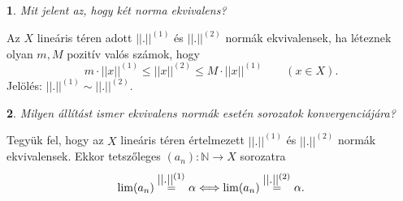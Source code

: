 \documentclass[a4paper]{article}
\def\N{\mathbb{N}}
\theoremstyle{qstyle}
\newtheorem{question}{}{}
\begin{document}
	
	\begin{question}
		Mit jelent az, hogy két norma ekvivalens?
	\end{question}
	Az $X$ lineáris téren adott $||.||^{(1)}$ és $||.||^{(2)}$ normák ekvivalensek, ha léteznek olyan $m,M$ pozitív valós számok, hogy
	$$m\cdot ||x||^{(1)}\le ||x||^{(2)}\le M\cdot ||x||^{(1)}\quad\quad (x\in X)\text{.}$$
	Jelölés: $||.||^{(1)} \sim ||.||^{(2)}$.

	\begin{question}
		Milyen állítást ismer ekvivalens normák esetén sorozatok konvergenciájára?
	\end{question}
	Tegyük fel, hogy az $X$ lineáris téren értelmezett $||.||^{(1)}$ és $||.||^{(2)}$ normák ekvivalensek. Ekkor tetszőleges $(a_n):\N\to X$ sorozatra
	$$\lim(a_n) \overset{\hbox{$||.||^{(1)}$}}{=} \alpha \Longleftrightarrow \lim(a_n) \stackrel{\hbox{$||.||^{(2)}$}}{\hbox{=}} \alpha \text{.} $$
\end{document}
